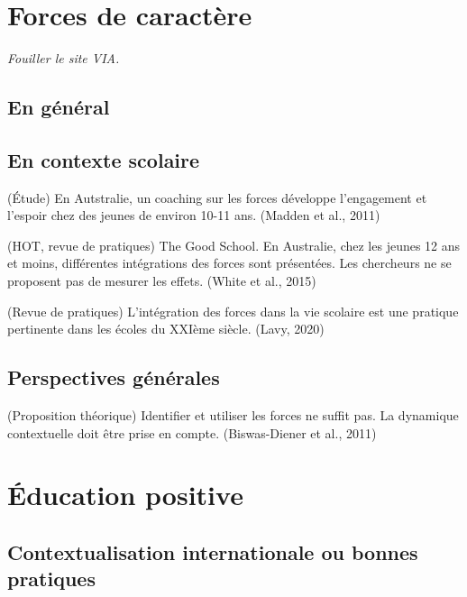 \documentclass[
  french,
]{article}
\begin{document}
\hypertarget{forces-de-caractuxe8re}{%
\section{Forces de caractère}\label{forces-de-caractuxe8re}}

\emph{Fouiller le site VIA.}

\hypertarget{en-guxe9nuxe9ral}{%
\subsection{En général}\label{en-guxe9nuxe9ral}}

\hypertarget{en-contexte-scolaire}{%
\subsection{En contexte scolaire}\label{en-contexte-scolaire}}

(Étude) En Autstralie, un coaching sur les forces développe l'engagement et l'espoir chez des jeunes de environ 10-11 ans. (Madden et al., 2011)

(HOT, revue de pratiques) The Good School. En Australie, chez les jeunes 12 ans et moins, différentes intégrations des forces sont présentées. Les chercheurs ne se proposent pas de mesurer les effets. (White et al., 2015)

(Revue de pratiques) L'intégration des forces dans la vie scolaire est une pratique pertinente dans les écoles du XXIème siècle. (Lavy, 2020)

\hypertarget{perspectives-guxe9nuxe9rales}{%
\subsection{Perspectives générales}\label{perspectives-guxe9nuxe9rales}}

(Proposition théorique) Identifier et utiliser les forces ne suffit pas. La dynamique contextuelle doit être prise en compte. (Biswas-Diener et al., 2011)

\hypertarget{uxe9ducation-positive}{%
\section{Éducation positive}\label{uxe9ducation-positive}}

\hypertarget{contextualisation-internationale-ou-bonnes-pratiques}{%
\subsection{Contextualisation internationale ou bonnes pratiques}\label{contextualisation-internationale-ou-bonnes-pratiques}}
\end{document}
